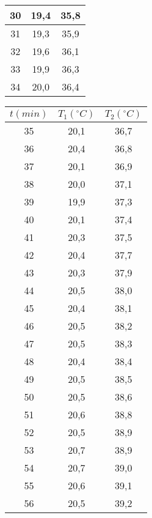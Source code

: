 \documentclass[12pt, a4paper, titlepage]{article}
\begin{document}
\begin{table}[H]
\begin{minipage}[c]{0,4\textwidth}
\begin{table}[H]
\begin{tabular}{|c|c|c|}
        30 & 19,4  & 35,8  \\ \hline
        31 & 19,3  & 35,9  \\ \hline
        32 & 19,6  & 36,1  \\ \hline
        33 & 19,9  & 36,3  \\ \hline
        34 & 20,0  & 36,4  \\ \hline
        \end{tabular}
      \end{table}
    \end{minipage}
    \begin{minipage}[c]{0,4\textwidth}
      \begin{table}[H]
        \centering
        \begin{tabular}{|c|c|c|}
        \hline
        $t(min)$  & $T_1 (^{\circ} C)$ & $T_2 (^{\circ} C)$ \\ \hline
        35 & 20,1  & 36,7  \\ \hline
        36 & 20,4  & 36,8  \\ \hline
        37 & 20,1  & 36,9  \\ \hline
        38 & 20,0  & 37,1  \\ \hline
        39 & 19,9  & 37,3  \\ \hline
        40 & 20,1  & 37,4  \\ \hline
        41 & 20,3  & 37,5  \\ \hline
        42 & 20,4  & 37,7  \\ \hline
        43 & 20,3  & 37,9  \\ \hline
        44 & 20,5  & 38,0  \\ \hline
        45 & 20,4  & 38,1  \\ \hline
        46 & 20,5  & 38,2  \\ \hline
        47 & 20,5  & 38,3  \\ \hline
        48 & 20,4  & 38,4  \\ \hline
        49 & 20,5  & 38,5  \\ \hline
        50 & 20,5  & 38,6  \\ \hline
        51 & 20,6  & 38,8  \\ \hline
        52 & 20,5  & 38,9  \\ \hline
        53 & 20,7  & 38,9  \\ \hline
        54 & 20,7  & 39,0  \\ \hline
        55 & 20,6  & 39,1  \\ \hline
        56 & 20,5  & 39,2  \\ \hline

\end{tabular}
\end{table}
\end{minipage}
\end{table}
\end{document}
